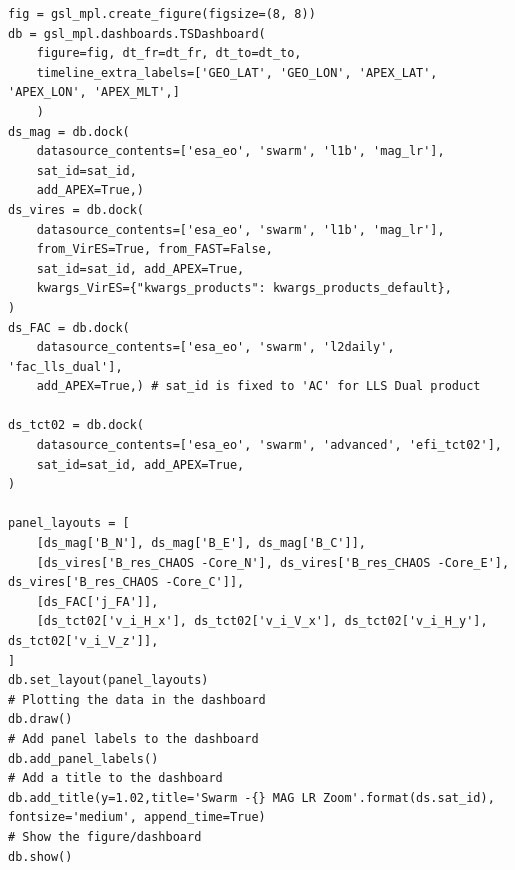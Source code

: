 \begin{verbatim}
fig = gsl_mpl.create_figure(figsize=(8, 8))
db = gsl_mpl.dashboards.TSDashboard(
    figure=fig, dt_fr=dt_fr, dt_to=dt_to,
    timeline_extra_labels=['GEO_LAT', 'GEO_LON', 'APEX_LAT', 'APEX_LON', 'APEX_MLT',] 
    )
ds_mag = db.dock(
    datasource_contents=['esa_eo', 'swarm', 'l1b', 'mag_lr'], 
    sat_id=sat_id, 
    add_APEX=True,)
ds_vires = db.dock(
    datasource_contents=['esa_eo', 'swarm', 'l1b', 'mag_lr'], 
    from_VirES=True, from_FAST=False,
    sat_id=sat_id, add_APEX=True,
    kwargs_VirES={"kwargs_products": kwargs_products_default},
)
ds_FAC = db.dock(
    datasource_contents=['esa_eo', 'swarm', 'l2daily', 'fac_lls_dual'], 
    add_APEX=True,) # sat_id is fixed to 'AC' for LLS Dual product

ds_tct02 = db.dock(
    datasource_contents=['esa_eo', 'swarm', 'advanced', 'efi_tct02'], 
    sat_id=sat_id, add_APEX=True,
)

panel_layouts = [
    [ds_mag['B_N'], ds_mag['B_E'], ds_mag['B_C']],
    [ds_vires['B_res_CHAOS -Core_N'], ds_vires['B_res_CHAOS -Core_E'], ds_vires['B_res_CHAOS -Core_C']],
    [ds_FAC['j_FA']],
    [ds_tct02['v_i_H_x'], ds_tct02['v_i_V_x'], ds_tct02['v_i_H_y'], ds_tct02['v_i_V_z']],
]
db.set_layout(panel_layouts)
# Plotting the data in the dashboard
db.draw()
# Add panel labels to the dashboard
db.add_panel_labels()
# Add a title to the dashboard
db.add_title(y=1.02,title='Swarm -{} MAG LR Zoom'.format(ds.sat_id), fontsize='medium', append_time=True)
# Show the figure/dashboard
db.show()
\end{verbatim}

